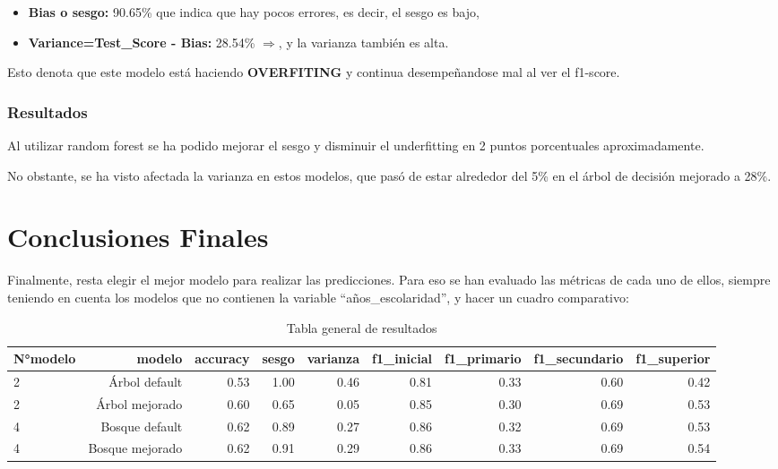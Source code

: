 \documentclass[a4paper]{article}
\begin{document}
            \begin{itemize}
                \item \textbf{Bias o sesgo:} 90.65\% que indica que hay pocos errores, es decir, el sesgo es bajo,
                \item \textbf{Variance=Test\_Score - Bias:} 28.54\% $\Rightarrow$, y la varianza también es alta. 
            \end{itemize} 

            Esto denota que este modelo está haciendo \textbf{OVERFITING} y continua desempeñandose mal al ver el f1-score.
            
            \subsubsection*{Resultados}
            
             Al utilizar random forest  se ha podido mejorar el sesgo y disminuir el underfitting en 2 puntos porcentuales aproximadamente.
    
            No obstante, se ha visto afectada la varianza en estos modelos, que pasó de estar alrededor del 5\% en el árbol de decisión mejorado a 28\%.

\newpage

\section{Conclusiones Finales}

    Finalmente, resta elegir el mejor modelo para realizar las predicciones. Para eso se han evaluado las métricas de cada uno de ellos, siempre teniendo en cuenta los modelos que no contienen la variable ``años\_escolaridad'', y hacer un cuadro comparativo:
    
    \begin{table}[H]
        \centering
        \begin{tabular}{|l|r|r|r|r|r|r|r|r|}
            \hline
           N°modelo & modelo & accuracy & sesgo & varianza & f1\_inicial & f1\_primario & f1\_secundario & f1\_superior \\ \hline
           2 & Árbol default & 0.53 & 1.00 & 0.46 & 0.81 & 0.33 & 0.60 & 0.42 \\ \hline
           2 &  Árbol mejorado & 0.60 & 0.65 & 0.05 & 0.85 & 0.30 & 0.69 & 0.53 \\ \hline
           4 & Bosque default & 0.62 & 0.89 & 0.27 & 0.86 & 0.32 & 0.69 & 0.53 \\ \hline
           4 & Bosque mejorado & 0.62 & 0.91 & 0.29 & 0.86 & 0.33 & 0.69 & 0.54 \\ \hline
        \end{tabular}
        \caption{Tabla general de resultados}
        \label{Result table}
    \end{table}
\end{document}
